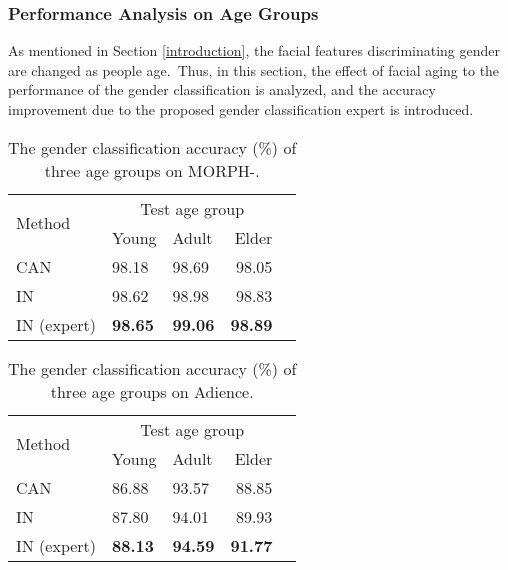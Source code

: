 \documentclass[10pt,twocolumn,letterpaper]{article}
\begin{document}
\subsubsection{Performance Analysis on Age Groups}
As mentioned in Section \ref{introduction}, the facial features discriminating gender are changed as people age.~Thus, in this section, the effect of facial aging to the performance of the gender classification is analyzed, and the accuracy improvement due to the proposed gender classification expert is introduced. 

\begin{table}[!h]
\centering
\caption{The gender classification accuracy (\%) of three age groups on MORPH-.}
\label{gender classification of age groups on MORPH}

\begin{adjustbox}{width=0.45\textwidth}
\begin{tabular}{p{3.5cm}llrl}
\hline
\multirow{2}{*}{Method} & \multicolumn{3}{c}{Test age group} \\ \cline{2-4} 
                        & Young    & Adult    & Elder   \\ \hline
CAN                     & 98.18    & 98.69    & 98.05   \\
IN                      & 98.62    & 98.98    & 98.83   \\
IN (expert)             & \textbf{98.65}    & \textbf{99.06}    & \textbf{98.89}   \\ \hline
\end{tabular}
\end{adjustbox}

\end{table}
\begin{table}[!h]
\centering
\caption{The gender classification accuracy (\%) of three age groups on Adience.}
\label{gender classification of age groups on Adience}

\begin{adjustbox}{width=0.45\textwidth}
\begin{tabular}{p{3.5cm}llrl}
\hline
\multirow{2}{*}{Method} & \multicolumn{3}{c}{Test age group} \\ \cline{2-4} 
                        & Young    & Adult    & Elder   \\ \hline
CAN                     & 86.88    & 93.57    & 88.85   \\
IN                      & 87.80    & 94.01    & 89.93   \\
IN (expert)             & \textbf{88.13}    & \textbf{94.59}    & \textbf{91.77}   \\ \hline
\end{tabular}
\end{adjustbox}
\end{table}
\end{document}
